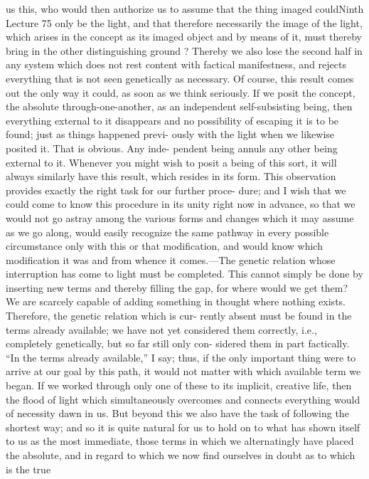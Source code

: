 us this, who would then authorize us to assume that the thing imaged couldNinth Lecture
75
only be the light, and that therefore necessarily the image of the light, which
arises in the concept as its imaged object and by means of it, must thereby
bring in the other distinguishing ground ? Thereby we also lose the second half
in any system which does not rest content with factical manifestness, and
rejects everything that is not seen genetically as necessary.
Of course, this result comes out the only way it could, as soon as we
think seriously. If we posit the concept, the absolute through-one-another, as an
independent self-subsisting being, then everything external to it disappears
and no possibility of escaping it is to be found; just as things happened previ-
ously with the light when we likewise posited it. That is obvious. Any inde-
pendent being annuls any other being external to it. Whenever you might
wish to posit a being of this sort, it will always similarly have this result, which
resides in its form.
This observation provides exactly the right task for our further proce-
dure; and I wish that we could come to know this procedure in its unity right
now in advance, so that we would not go astray among the various forms and
changes which it may assume as we go along, would easily recognize the same
pathway in every possible circumstance only with this or that modification,
and would know which modification it was and from whence it comes.—The
genetic relation whose interruption has come to light must be completed. This
cannot simply be done by inserting new terms and thereby filling the gap, for
where would we get them? We are scarcely capable of adding something in
thought where nothing exists. Therefore, the genetic relation which is cur-
rently absent must be found in the terms already available; we have not yet
considered them correctly, i.e., completely genetically, but so far still only con-
sidered them in part factically. “In the terms already available,” I say; thus, if
the only important thing were to arrive at our goal by this path, it would not
matter with which available term we began. If we worked through only one of
these to its implicit, creative life, then the flood of light which simultaneously
overcomes and connects everything would of necessity dawn in us. But
beyond this we also have the task of following the shortest way; and so it is
quite natural for us to hold on to what has shown itself to us as the most
immediate, those terms in which we alternatingly have placed the absolute,
and in regard to which we now find ourselves in doubt as to which is the true
